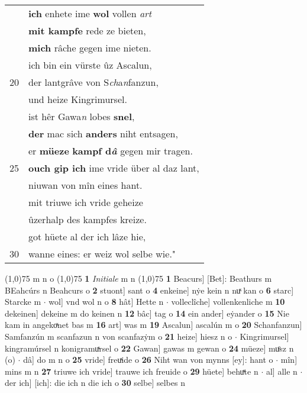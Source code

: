 \documentclass[8pt,a4paper,notitlepage]{article}
\begin{document}
\begin{table}[ht]
\begin{minipage}[t]{0.5\linewidth}
\begin{tabular}{rl}
 & \textbf{ich} enhete ime \textbf{wol} vollen \textit{art}\\ 
 & \textbf{mit kampfe} rede ze bieten,\\ 
 & \textbf{mich} râche gegen ime nieten.\\ 
 & ich bin ein vürste ûz Ascalun,\\ 
20 & der lantgrâve von S\textit{ch}a\textit{n}fanzun,\\ 
 & und heize Kingrimursel.\\ 
 & ist hêr Gawa\textit{n} lobes \textbf{snel},\\ 
 & \textbf{der} mac sich \textbf{anders} niht entsagen,\\ 
 & er \textbf{müeze} \textbf{kampf d\textit{â}} gegen mir tragen.\\ 
25 & \textbf{ouch gip ich} ime vride über al daz lant,\\ 
 & niuwan von mîn eines hant.\\ 
 & mit triuwe ich vride geheize\\ 
 & ûzerhalp des kampfes kreize.\\ 
 & got hüete al der ich lâze hie,\\ 
30 & wanne eines: er weiz wol selbe wie."\\ 
\end{tabular}
\scriptsize
\line(1,0){75} \newline
m n o \newline
\line(1,0){75} \newline
\textbf{1} \textit{Initiale} m n  \newline
\line(1,0){75} \newline
\textbf{1} Beacurs] [Bet]: Beathurs m BEahcúrs n Beahcurs o \textbf{2} stuont] sant o \textbf{4} enkeine] nẏe kein n nuͯ kan o \textbf{6} starc] Starcke m  $\cdot$ wol] vnd wol n o \textbf{8} hât] Hette n  $\cdot$ volleclîche] vollenkenliche m \textbf{10} dekeinen] dekeine m do keinen n \textbf{12} bâc] tag o \textbf{14} ein ander] eẏander o \textbf{15} Nie kam in angekoͯnet bas m \textbf{16} art] was m \textbf{19} Ascalun] ascalún m o \textbf{20} Schanfanzun] Samfanzún m scanfazun n von scanfazẏm o \textbf{21} heize] hiesz n o  $\cdot$ Kingrimursel] kingramúrsel n konigramuͯrsel o \textbf{22} Gawan] gawas m gewan o \textbf{24} müeze] muͦsz n (o)  $\cdot$ dâ] do m n o \textbf{25} vride] freuͯide o \textbf{26} Niht wan von mynns [ey]: hant o  $\cdot$ mîn] mins m n \textbf{27} triuwe ich vride] trauwe ich freuide o \textbf{29} hüete] behuͯte n  $\cdot$ al] alle n  $\cdot$ der ich] [ich]: die ich n die ich o \textbf{30} selbe] selbes n \newline
\end{minipage}
\end{table}
\end{document}
